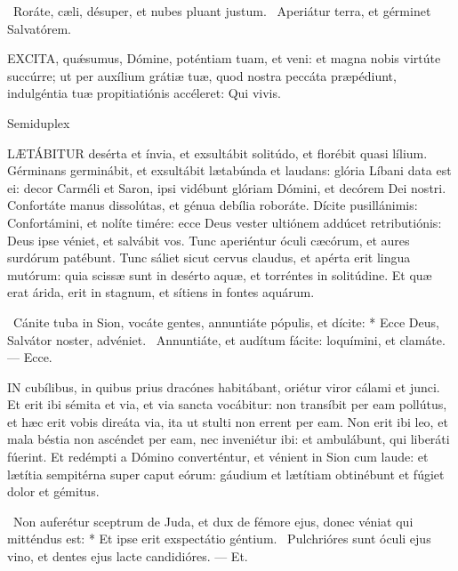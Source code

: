 \V\ Roráte, cæli, désuper, et nubes pluant justum. \R\ Aperiátur terra, et gérminet Salvatórem.



\lettrine[lines=2]{E}{XCITA}, quǽsumus, Dómine, poténtiam tuam, et veni: et magna nobis virtúte succúrre; ut per auxílium grátiæ tuæ, quod nostra peccáta præpédiunt, indulgéntia tuæ propitiatiónis accéleret: Qui vivis.

\sectionornament


 Semiduplex




\lettrine[lines=2]{L}{ÆTÁBITUR} desérta et ínvia, et exsultábit solitúdo, et florébit quasi lílium. Gérminans germinábit, et exsultábit lætabúnda et laudans: glória Líbani data est ei: decor Carméli et Saron, ipsi vidébunt glóriam Dómini, et decórem Dei nostri. Confortáte manus dissolútas, et génua debília roboráte. Dícite pusillánimis: Confortámini, et nolíte timére: ecce Deus vester ultiónem addúcet retributiónis: Deus ipse véniet, et salvábit vos. Tunc aperiéntur óculi cæcórum, et aures surdórum patébunt. Tunc sáliet sicut cervus claudus, et apérta erit lingua mutórum: quia scissæ sunt in desérto aquæ, et torréntes in solitúdine. Et quæ erat árida, erit in stagnum, et sítiens in fontes aquárum.

\R\ Cánite tuba in Sion, vocáte gentes, annuntiáte pópulis, et dícite: * Ecce Deus, Salvátor noster, advéniet. \V\ Annuntiáte, et audítum fácite: loquímini, et clamáte. --- Ecce.


\lettrine[lines=2]{I}{N} cubílibus, in quibus prius dracónes habitábant, oriétur viror cálami et junci. Et erit ibi sémita et via, et via sancta vocábitur: non transíbit per eam pollútus, et hæc erit vobis direáta via, ita ut stulti non errent per eam. Non erit ibi leo, et mala béstia non ascéndet per eam, nec inveniétur ibi: et ambulábunt, qui liberáti fúerint. Et redémpti a Dómino converténtur, et vénient in Sion cum laude: et lætítia sempitérna super caput eórum: gáudium et lætítiam obtinébunt et fúgiet dolor et gémitus.

\R\ Non auferétur sceptrum de Juda, et dux de fémore ejus, donec véniat qui mitténdus est: * Et ipse erit exspectátio géntium. \V\ Pulchrióres sunt óculi ejus vino, et dentes ejus lacte candidióres. --- Et.

